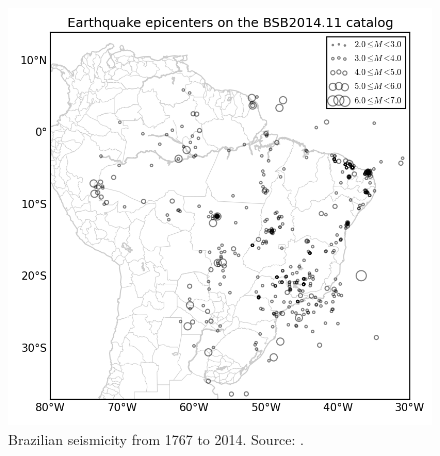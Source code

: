 \documentclass[draft, grl]{agutex}
\begin{document}





\newpage


\begin{figure}
	\includegraphics[width=0.5\linewidth]{z_img_seismicity}
	\caption{Brazilian seismicity from 1767 to 2014. Source: \citep{bsb_2014}.}
	\label{fig_seismicity}
\end{figure}
\end{document}
